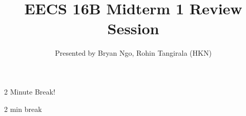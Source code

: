 

\title{EECS 16B Midterm 1 Review Session}
\author{Presented by Bryan Ngo, Rohin Tangirala (HKN)}
\date{}

\newcommand{\SlideAccessingLogistics}{@1046}










\begin{frame}
    2 Minute Break!
\end{frame}




\begin{frame}
	2 min break
\end{frame}








